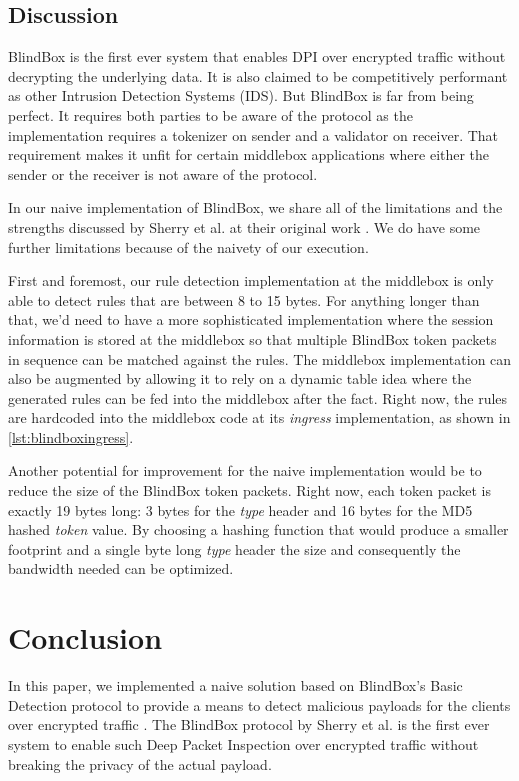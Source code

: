 \documentclass{winslabreport}
\begin{document}
\subsection{Discussion}

BlindBox is the first ever system that enables DPI over encrypted traffic without decrypting the underlying data. It is also claimed to be competitively performant as other Intrusion Detection Systems (IDS). But BlindBox is far from being perfect. It requires both parties to be aware of the protocol as the implementation requires a tokenizer on sender and a validator on receiver. That requirement makes it unfit for certain middlebox applications where either the sender or the receiver is not aware of the protocol.

In our naive implementation of BlindBox, we share all of the limitations and the strengths discussed by Sherry et al. at their original work \cite{Blindbox}. We do have some further limitations because of the naivety of our execution. 

First and foremost, our rule detection implementation at the middlebox is only able to detect rules that are between 8 to 15 bytes. For anything longer than that, we'd need to have a more sophisticated implementation where the session information is stored at the middlebox so that multiple BlindBox token packets in sequence can be matched against the rules. The middlebox implementation can also be augmented by allowing it to rely on a dynamic table idea where the generated rules can be fed into the middlebox after the fact. Right now, the rules are hardcoded into the middlebox code at its \emph{ingress} implementation, as shown in \autoref{lst:blindboxingress}.

Another potential for improvement for the naive implementation would be to reduce the size of the BlindBox token packets. Right now, each token packet is exactly 19 bytes long: 3 bytes for the \emph{type} header and 16 bytes for the MD5 hashed \emph{token} value. By choosing a hashing function that would produce a smaller footprint and a single byte long \emph{type} header the size and consequently the bandwidth needed can be optimized. 

\section{Conclusion}

In this paper, we implemented a naive solution based on BlindBox's Basic Detection protocol to provide a means to detect malicious payloads for the clients over encrypted traffic . The BlindBox protocol by Sherry et al. is the first ever system to enable such Deep Packet Inspection over encrypted traffic without breaking the privacy of the actual payload. 
\end{document}
